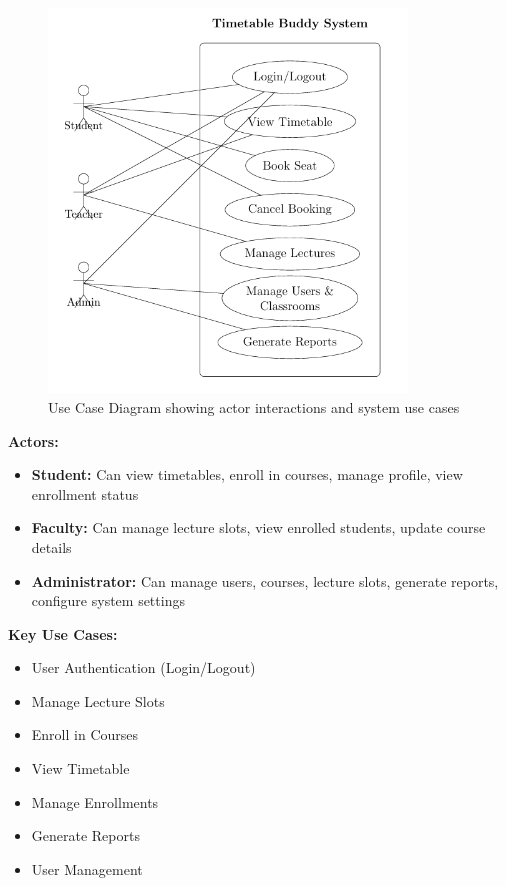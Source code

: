 \begin{figure}[h]
    \centering
    \includegraphics[width=0.85\textwidth]{images/Usecase diagram.png}
    \caption{Use Case Diagram showing actor interactions and system use cases}
    \label{fig:usecase}
\end{figure}

\textbf{Actors:}
\begin{itemize}[leftmargin=*]
    \item \textbf{Student:} Can view timetables, enroll in courses, manage profile, view enrollment status
    \item \textbf{Faculty:} Can manage lecture slots, view enrolled students, update course details
    \item \textbf{Administrator:} Can manage users, courses, lecture slots, generate reports, configure system settings
\end{itemize}

\textbf{Key Use Cases:}
\begin{itemize}[leftmargin=*]
    \item User Authentication (Login/Logout)
    \item Manage Lecture Slots
    \item Enroll in Courses
    \item View Timetable
    \item Manage Enrollments
    \item Generate Reports
    \item User Management
\end{itemize}

